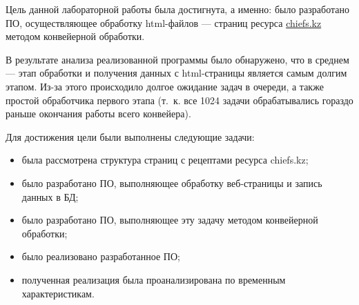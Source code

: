 
Цель данной лабораторной работы была достигнута, а именно: было разработано ПО, осуществляющее обработку html-файлов --- страниц ресурса \url{chiefs.kz} методом конвейерной обработки.

В результате анализа реализованной программы было обнаружено, что в среднем --- этап обработки и получения данных с html-страницы является самым долгим этапом. Из-за этого происходило долгое ожидание задач в очереди, а также простой обработчика первого этапа (т.~к. все 1024 задачи обрабатывались гораздо раньше окончания работы всего конвейера).

Для достижения цели были выполнены следующие задачи:
\begin{itemize}
  \item была рассмотрена структура страниц с рецептами ресурса chiefs.kz;
  \item было разработано ПО, выполняющее обработку веб-страницы и запись данных в БД;
  \item было разработано ПО, выполняющее эту задачу методом конвейерной обработки;
  \item было реализовано разработанное ПО;
  \item полученная реализация была проанализирована по временным характеристикам.
\end{itemize}

